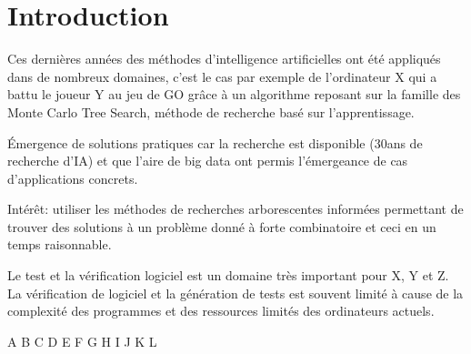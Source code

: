 \chapter*{Introduction}

Ces dernières années des méthodes d'intelligence artificielles ont été appliqués dans de nombreux domaines, c'est le cas par exemple de l'ordinateur X qui a battu le joueur Y au jeu de GO grâce à un algorithme reposant sur la famille des Monte Carlo Tree Search, méthode de recherche basé sur l'apprentissage.

Émergence de solutions pratiques car la recherche est disponible (30ans de recherche d'IA) et que l'aire de big data ont permis l'émergeance de cas d'applications concrets.

Intérêt: utiliser les méthodes de recherches arborescentes informées permettant de trouver des solutions à un problème donné à forte combinatoire et ceci en un temps raisonnable.

Le test et la vérification logiciel est un domaine très important pour X, Y et Z.
La vérification de logiciel et la génération de tests est souvent limité à cause de la complexité des programmes et des ressources limités des ordinateurs actuels.

A\cite{judea-pearl-heuristics}
B\cite{MCTS-methods-survey}
C\cite{MTCS-symbolic-execution-path-exploration}
D\cite{MTCS-program-synthesis}
E\cite{MTCS-symbolic-execution-less-path}
F\cite{testing-and-machine-learning}
G\cite{test-data-generation-water-drop}
H\cite{symbolic-execution-machine-learning}
I\cite{testsurvey}
J\cite{shadow}    
K\cite{ART}    
L\cite{EFSM}    
